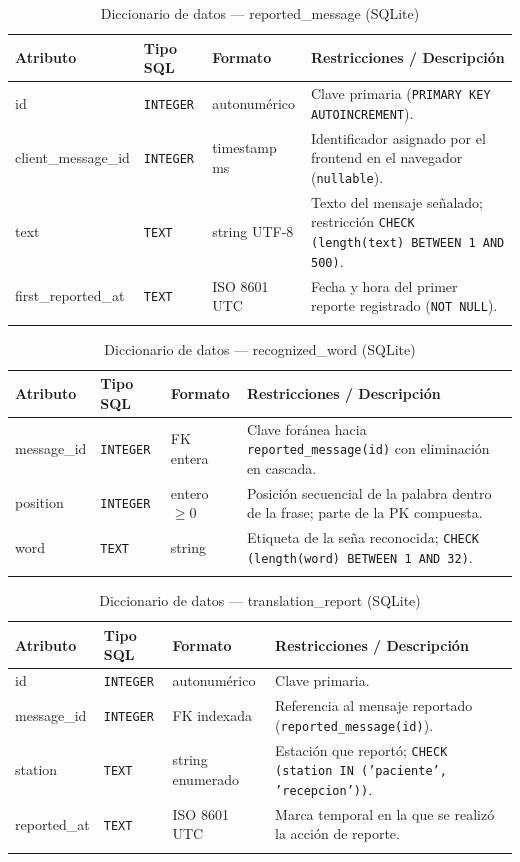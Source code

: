 \begin{longtable}{p{3.2cm} p{2.2cm} p{3.2cm} p{5.2cm}}
    \toprule
    \textbf{Atributo} & \textbf{Tipo SQL} & \textbf{Formato} & \textbf{Restricciones / Descripción} \\
    \midrule
    \endhead
    id & \texttt{INTEGER} & autonumérico & Clave primaria (\texttt{PRIMARY KEY AUTOINCREMENT}). \\
    client\_message\_id & \texttt{INTEGER} & timestamp ms & Identificador asignado por el frontend en el navegador (\texttt{nullable}). \\
    text & \texttt{TEXT} & string UTF-8 & Texto del mensaje señalado; restricción \texttt{CHECK (length(text) BETWEEN 1 AND 500)}. \\
    first\_reported\_at & \texttt{TEXT} & ISO 8601 UTC & Fecha y hora del primer reporte registrado (\texttt{NOT NULL}). \\
    \bottomrule
    \caption{Diccionario de datos — reported\_message (SQLite)}
    \label{tab:dat-dic-reported-msg}
\end{longtable}

\begin{longtable}{p{3.2cm} p{2.2cm} p{3.2cm} p{5.2cm}}
    \toprule
    \textbf{Atributo} & \textbf{Tipo SQL} & \textbf{Formato} & \textbf{Restricciones / Descripción} \\
    \midrule
    \endhead
    message\_id & \texttt{INTEGER} & FK entera & Clave foránea hacia \texttt{reported\_message(id)} con eliminación en cascada. \\
    position & \texttt{INTEGER} & entero $\geq 0$ & Posición secuencial de la palabra dentro de la frase; parte de la PK compuesta. \\
    word & \texttt{TEXT} & string & Etiqueta de la seña reconocida; \texttt{CHECK (length(word) BETWEEN 1 AND 32)}. \\
    \bottomrule
    \caption{Diccionario de datos — recognized\_word (SQLite)}
    \label{tab:dat-dic-rec-word}
\end{longtable}

\begin{longtable}{p{3.2cm} p{2.2cm} p{3.2cm} p{5.2cm}}
    \toprule
    \textbf{Atributo} & \textbf{Tipo SQL} & \textbf{Formato} & \textbf{Restricciones / Descripción} \\
    \midrule
    \endhead
    id & \texttt{INTEGER} & autonumérico & Clave primaria. \\
    message\_id & \texttt{INTEGER} & FK indexada & Referencia al mensaje reportado (\texttt{reported\_message(id)}). \\
    station & \texttt{TEXT} & string enumerado & Estación que reportó; \texttt{CHECK (station IN ('paciente', 'recepcion'))}. \\
    reported\_at & \texttt{TEXT} & ISO 8601 UTC & Marca temporal en la que se realizó la acción de reporte. \\
    \bottomrule
    \caption{Diccionario de datos — translation\_report (SQLite)}
    \label{tab:dat-dic-trans-report}
\end{longtable}

